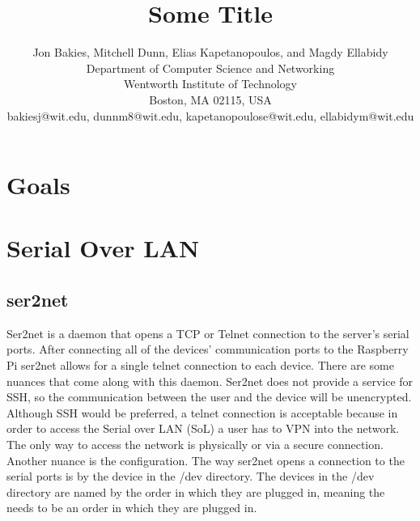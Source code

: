 \documentclass[12pt]{IEEEtran}
\begin{document}
\title{Some Title}
\author{
Jon Bakies, Mitchell Dunn, Elias Kapetanopoulos, and Magdy Ellabidy \\
Department of Computer Science and Networking \\
Wentworth Institute of Technology \\
Boston, MA 02115, USA \\
bakiesj@wit.edu, dunnm8@wit.edu, kapetanopoulose@wit.edu, ellabidym@wit.edu
} 

\maketitle
\newpage
\clearpage

\section{Goals}


\section{Serial Over LAN}
\subsection{ser2net}
Ser2net is a daemon that opens a TCP or Telnet connection to the server's serial ports.
After connecting all of the devices' communication ports to the Raspberry Pi ser2net allows for a single telnet connection to each device.
There are some nuances that come along with this daemon.
Ser2net does not provide a service for SSH, so the communication between the user and the device will be unencrypted.
Although SSH would be preferred, a telnet connection is acceptable because in order to access the Serial over LAN (SoL) a user has to VPN into the network.
The only way to access the network is physically or via a secure connection.
Another nuance is the configuration.
The way ser2net opens a connection to the serial ports is by the device in the /dev directory.
The devices in the /dev directory are named by the order in which they are plugged in, meaning the needs to be an order in which they are plugged in.
\end{document}
